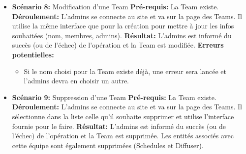 \documentclass[french]{article}
\begin{document}
\begin{appendices}
\begin{itemize}
		\item \textbf{Scénario 8:} Modification d'une Team\newline
		\textbf{Pré-requis:} La Team existe.\newline
		\textbf{Déroulement:} L'admins se connecte au site et va sur la page des Teams. Il utilise la même interface que pour la création pour mettre à jour les infos souhaitées (nom, membres, admins).\newline
		\textbf{Résultat:} L'admins est informé du succès (ou de l'échec) de l'opération et la Team est modifiée.\newline
		\textbf{Erreurs potentielles:} 
			\begin{itemize}
				\item Si le nom choisi pour la Team existe déjà, une erreur sera lancée et l'admins devra en choisir un autre. \newline
			\end{itemize}
		
		\item \textbf{Scénario 9:} Suppression d'une Team\newline
		\textbf{Pré-requis:} La Team existe.\newline
		\textbf{Déroulement:} L'admins se connecte au site et va sur la page des Teams. Il sélectionne dans la liste celle qu'il souhaite supprimer et utilise l'interface fournie pour le faire. \newline
		\textbf{Résultat:} L'admins est informé du succès (ou de l'échec) de l'opération et la Team est supprimée. Les entités associés avec cette équipe sont également supprimées (Schedules et Diffuser). \newline

					
		\end{itemize}
		\newpage
	 

\end{appendices}
\end{document}
